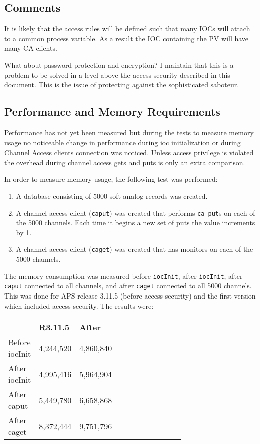 \subsection{Comments}

It is likely that the access rules will be defined such that many IOCs will attach to a common process variable. As a result 
the IOC containing the PV will have many CA clients.

What about password protection and encryption? I maintain that this is a problem to be solved in a level above the access 
security described in this document. This is the issue of protecting against the sophisticated saboteur.

\subsection{Performance and Memory Requirements}

Performance has not yet been measured but during the tests to measure memory usage no noticeable change in 
performance during ioc initialization or during Channel Access clients connection was noticed. Unless access privilege is 
violated the overhead during channel access gets and puts is only an extra comparison.

In order to measure memory usage, the following test was performed:

\begin{enumerate}\item A database consisting of 5000 soft analog records was created.

\item A channel access client (\verb|caput|) was created that performs \verb|ca_put|s on each of the 5000 channels. Each time it 
begins a new set of puts the value increments by 1.

\item A channel access client (\verb|caget|) was created that has monitors on each of the 5000 channels.

\end{enumerate}The memory consumption was measured before \verb|iocInit|, after \verb|iocInit|, after \verb|caput| connected to all channels, and 
after \verb|caget| connected to all 5000 channels. This was done for APS release 3.11.5 (before access security) and the first 
version which included access security. The results were:
\begin{center}\begin{longtable}{llp{0.7\linewidth}}
 & R3.11.5 & After\\
\hline
Before iocInit & 4,244,520 & 4,860,840\\
After iocInit & 4,995,416 & 5,964,904\\
After caput & 5,449,780 & 6,658,868\\
After caget & 8,372,444 & 9,751,796
\end{longtable}\end{center}


